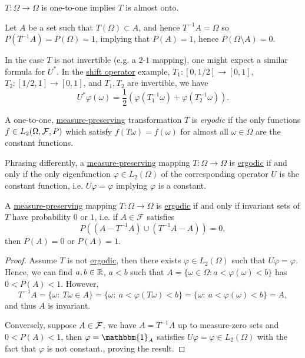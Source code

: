 \begin{remark}
	\(T\colon \Omega \to \Omega\) is one-to-one implies \(T\) is almost onto.
\end{remark}
\begin{explanation}
	Let \(A\) be a set such that \(T(\Omega) \subset A\), and hence \(T^{-1} A = \Omega\) so \(P(T^{-1}A) = P(\Omega) = 1\), implying that \(P(A) = 1\), hence \(P(\Omega \setminus A) = 0\).
\end{explanation}

In the case \(T\) is not invertible (e.g. a \(2\)-\(1\) mapping), one might expect a similar formula for \(U^{\ast}\). In the \hyperref[eg:shift-op]{shift operator} example, \(T_1\colon [0, 1 / 2] \to [0,1]\), \(T_2\colon [1 / 2, 1] \to [0,1]\), and \(T_1, T_2\) are invertible, we have
\[
	U^{\ast} \varphi(\omega) = \frac{1}{2}\left( \varphi(T_1^{-1} \omega) + \varphi(T_2^{-1} \omega) \right) .
\]

\begin{definition}\label{def:ergodic-transformation}
	A one-to-one, \hyperref[def:measure-preserving]{measure-preserving} transformation \(T\) is \emph{ergodic} if the only functions \(f\in L_2 (\Omega , \mathcal{\MakeUppercase{f}} , P)\) which satisfy \(f(T \omega ) = f(\omega )\) for almost all \(\omega \in \Omega \) are the constant functions.
\end{definition}
\begin{remark}[Eigenfunction]
	Phrasing differently, a \hyperref[def:measure-preserving]{measure-preserving} mapping \(T\colon \Omega \to \Omega\) is \hyperref[def:ergodic-transformation]{ergodic} if and only if the only eigenfunction \(\varphi \in L_2(\Omega)\) of the corresponding operator \(U\) is the constant function, i.e. \(U \varphi = \varphi\) implying \(\varphi\) is a constant.
\end{remark}

\begin{lemma}
	A \hyperref[def:measure-preserving]{measure-preserving} mapping \(T\colon \Omega \to \Omega\) is \hyperref[def:ergodic-transformation]{ergodic} if and only if invariant sets of \(T\) have probability \(0\) or \(1\), i.e. if \(A \in \mathcal{F}\) satisfies
	\[
		P((A - T^{-1} A) \cup (T^{-1} A - A)) = 0,
	\]
	then \(P(A) = 0\) or \(P(A) = 1\).
\end{lemma}
\begin{proof}
	Assume \(T\) is not \hyperref[def:ergodic-transformation]{ergodic}, then there exists \(\varphi \in L_2(\Omega)\) such that \(U \varphi = \varphi\). Hence, we can find \(a,b \in \mathbb{\MakeUppercase{r}}\), \(a < b\) such that \(A = \{\omega \in \Omega\colon a < \varphi(\omega) < b\}\) has \(0 < P(A) < 1\). However,
	\[
		T^{-1}A  = \{\omega:\ T \omega \in A\}
		= \{\omega:\ a < \varphi(T \omega) < b\}
		= \{\omega:\ a < \varphi(\omega) < b\} = A,
	\]
	and thus \(A\) is invariant.

	Conversely, suppose \(A \in \mathcal{\MakeUppercase{f}}\), we have \(A = T^{-1}A\) up to measure-zero sets and \(0 < P(A) < 1\), then \(\varphi = \mathbbm{1}_A\) satisfies \(U \varphi = \varphi \in L_2(\Omega)\) with the fact that \(\varphi\) is not constant., proving the result.
\end{proof}


